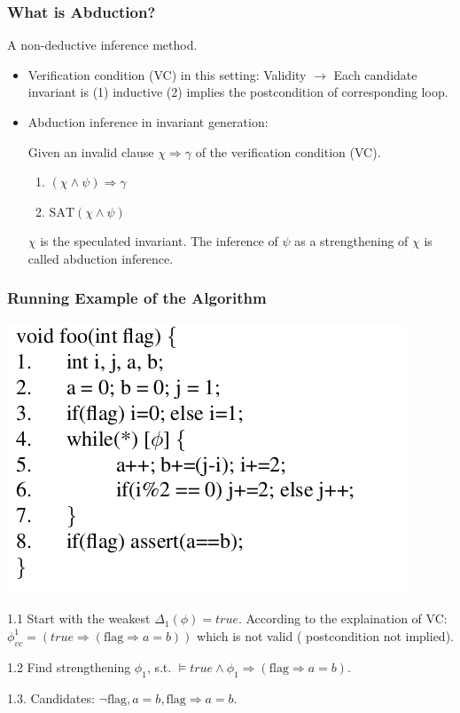 \documentclass[11pt]{beamer}
\begin{document}
\begin{frame}\frametitle{What is Abduction?}

A non-deductive inference method.

\begin{itemize}
\item 
Verification condition (VC) in this setting: 
Validity $\longrightarrow$
Each candidate invariant is (1) inductive (2) implies the postcondition of corresponding loop.


\item Abduction inference in invariant generation:

Given an invalid clause $\chi\Rightarrow \gamma$ of the verification condition (VC).
\begin{enumerate}
\item $(\chi\wedge \psi )\Rightarrow \gamma$

\item $\text{SAT}(\chi\wedge \psi)$
\end{enumerate}

$\chi$ is the speculated invariant. The inference of $\psi$ as a strengthening of $\chi$ is called abduction inference.

\end{itemize}

\end{frame}

\begin{frame}\frametitle{Running Example of the Algorithm}
\begin{center}
\includegraphics[scale=0.4]{exp.png}
\end{center}

1.1 Start with the weakest $\Delta_1(\phi) = true$. According to the explaination of VC: $\phi_{vc}^1 = (true\Rightarrow (\text{flag}\Rightarrow a = b))$ which is not valid ( postcondition not implied).

1.2 Find strengthening $\phi_1$, s.t. $\models true\wedge \phi_1 \Rightarrow (\text{flag}\Rightarrow a = b)$.

1.3. Candidates: $\neg \text{flag}, a = b, \text{flag}\Rightarrow a = b$.

\end{frame}
\end{document}

